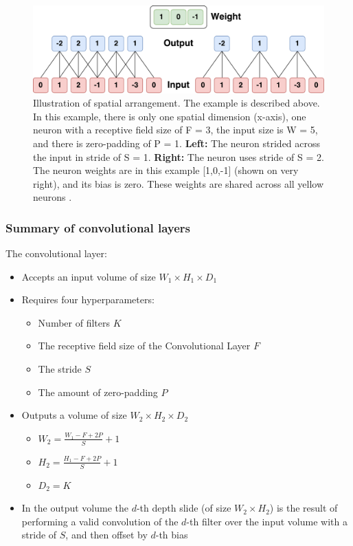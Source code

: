 \begin{figure}[H]
	\centering
	\includegraphics[width=1\textwidth]{Figures/Spatial_size.pdf}
	\caption{Illustration of spatial arrangement. The example is described above. In this example, there is only one spatial dimension (x-axis), one neuron with a receptive field size of F = 3, the input size is W = 5, and there is zero-padding of P = 1. \textbf{Left:} The neuron strided across the input in stride of S = 1. \textbf{Right:} The neuron uses stride of S = 2.
	The neuron weights are in this example [1,0,-1] (shown on very right), and its bias is zero. These weights are shared across all yellow neurons \cite{CNN_course}.
	}
	\label{fig:Spatial_size}
\end{figure} 

\subsubsection{Summary of convolutional layers}
The convolutional layer:
\begin{itemize}
	\item Accepts an input volume of size $W_1 \times  H_1 \times  D_1$
	\item Requires four hyperparameters:
	\begin{itemize}
		\item Number of filters $K$
		\item The receptive field size of the Convolutional Layer $F$ 
		\item The stride $S$
		\item The amount of zero-padding $P$ 
	\end{itemize}
	\item Outputs a volume of size $W_2 \times  H_2 \times  D_2$
	\begin{itemize}
		\item $W_2 = \frac{W_1-F+2P}{S}+1$
		\item $H_2 = \frac{H_1-F+2P}{S}+1$
		\item $D_2 = K$
	\end{itemize}
	\item In the output volume the $d$-th depth slide (of size $W_2 \times  H_2$) is the result of performing a valid convolution of the $d$-th filter over the input volume with a stride of $S$, and then offset by $d$-th bias
\end{itemize}

